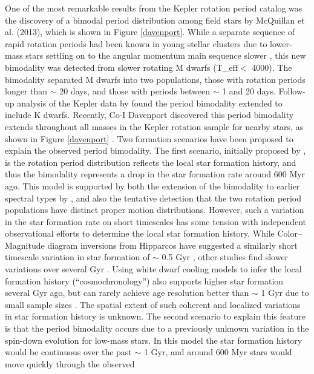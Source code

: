 \documentclass[useAMS, usenatbib, preprint, 12pt]{aastex}
\newcommand{\eg}{{\it e.g.}}
\begin{document}
One of the most remarkable results from the Kepler rotation period catalog was
the discovery of a bimodal period distribution among field stars by McQuillan
et al. (2013), which is shown
in Figure \ref{davenport}.
While a separate sequence of rapid rotation periods had been known in young
stellar clusters due to lower-mass stars settling on to the angular momentum
main sequence slower \citep[\eg][]{barnes2007}, this new bimodality was
detected from slower rotating M dwarfs (T_$\mathrm{eff} <$ 4000).
The bimodality separated M dwarfs into two populations, those with rotation
periods longer than $\sim$ 20 days, and those with periods between $\sim$ 1
and 20 days.
Follow-up analysis of the Kepler data by \citet{mcquillan2014} found the
period bimodality extended to include K dwarfs.
Recently, Co-I Davenport discovered this period bimodality extends throughout
all masses in the Kepler rotation sample for nearby stars, as shown in Figure
\ref{davenport} \citep{davenport2017}.
Two formation scenarios have been proposed to explain the observed period
bimodality.
The first scenario, initially proposed by \citet{mcquillan2013}, is the
rotation period distribution reflects the local star formation history, and
thus the bimodality represents a drop in the star formation rate around 600
Myr ago.
This model is supported by both the extension of the bimodality to earlier
spectral types by \citet{davenport2017}, and also the tentative detection that
the two rotation period populations have distinct proper motion distributions.
However, such a variation in the star formation rate on short timescales has
some tension with independent observational efforts to determine the local
star formation history.
While Color–Magnitude diagram inversions from Hipparcos have suggested a
similarly short timescale variation in star formation of $\sim$ 0.5 Gyr
\citep{hernandez2000}, other studies find slower variations over several
Gyr \citep[\eg][]{cignoni2006}.
Using white dwarf cooling models to infer the local formation history
(“cosmochronology”) also supports higher star formation several Gyr ago, but
can rarely achieve age resolution better than $\sim$ 1 Gyr due to small sample
sizes \citep{tremblay2014}.
The spatial extent of such coherent and localized variations in star formation
history is unknown.
The second scenario to explain this feature is that the period bimodality
occurs due to a previously unknown variation in the spin-down evolution for
low-mass stars.
In this model the star formation history would be continuous over the past
$\sim$ 1 Gyr, and around 600 Myr stars would move quickly through the observed
\end{document}
